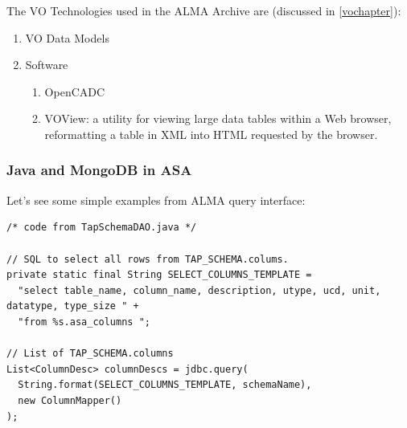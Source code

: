 

The VO Technologies used in the ALMA Archive are (discussed in \ref{vochapter}):

\begin{enumerate}
\item VO Data Models
\item Software
  \begin{enumerate}
    \item OpenCADC
    \item VOView: a utility for viewing large data tables within a Web browser, reformatting a table in XML into HTML requested by the browser.
  \end{enumerate}
\end{enumerate}

\subsubsection{Java and MongoDB in ASA}

Let's see some simple examples from ALMA query interface: 

\newpage
\begin{lstlisting}
/* code from TapSchemaDAO.java */

// SQL to select all rows from TAP_SCHEMA.colums.
private static final String SELECT_COLUMNS_TEMPLATE = 
  "select table_name, column_name, description, utype, ucd, unit, datatype, type_size " +
  "from %s.asa_columns ";

// List of TAP_SCHEMA.columns
List<ColumnDesc> columnDescs = jdbc.query(
  String.format(SELECT_COLUMNS_TEMPLATE, schemaName),
  new ColumnMapper()
);


\end{lstlisting}

% 
% 